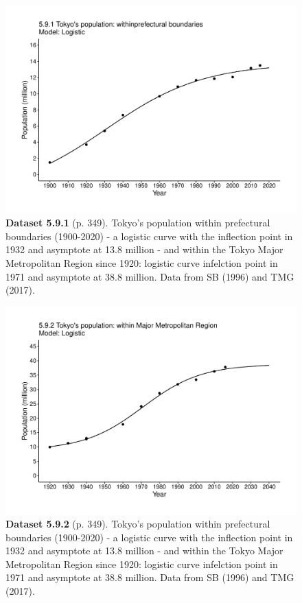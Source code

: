\documentclass[aps,rmp,preprint,superscriptaddress,10pt,onecolumn]{article}
\begin{document}
\clearpage
\begin{figure}[h]
\includegraphics[width=\textwidth]{output/figs-ggplot/5.9.1.pdf}
\caption*{\textbf{Dataset 5.9.1} (p. 349). Tokyo's population within prefectural boundaries (1900-2020) - a logistic curve with the inflection point in 1932 and asymptote at 13.8 million - and within the Tokyo Major Metropolitan Region since 1920: logistic curve infelction point in 1971 and asymptote at 38.8 million. Data from SB (1996) and TMG (2017). }
\end{figure}
	
\clearpage
\begin{figure}[h]
\includegraphics[width=\textwidth]{output/figs-ggplot/5.9.2.pdf}
\caption*{\textbf{Dataset 5.9.2} (p. 349). Tokyo's population within prefectural boundaries (1900-2020) - a logistic curve with the inflection point in 1932 and asymptote at 13.8 million - and within the Tokyo Major Metropolitan Region since 1920: logistic curve infelction point in 1971 and asymptote at 38.8 million. Data from SB (1996) and TMG (2017). }
\end{figure}
	
\end{document}
